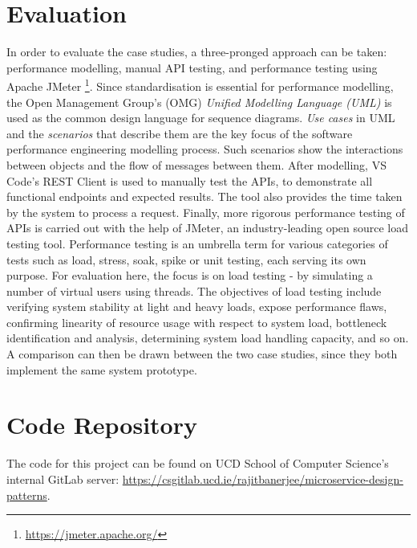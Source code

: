 \section{Evaluation}

In order to evaluate the case studies, a three-pronged approach can be taken: performance modelling, manual API testing, and performance testing using Apache JMeter \footnote{\url{https://jmeter.apache.org/}}. Since standardisation is essential for performance modelling, the Open Management Group's (OMG) \textit{Unified Modelling Language (UML)} is used as the common design language for sequence diagrams. \textit{Use cases} in UML and the \textit{scenarios} that describe them are the key focus of the software performance engineering modelling process. Such scenarios show the interactions between objects and the flow of messages between them. After modelling, VS Code's REST Client is used to manually test the APIs, to demonstrate all functional endpoints and expected results. The tool also provides the time taken by the system to process a request. Finally, more rigorous performance testing of APIs is carried out with the help of JMeter, an industry-leading open source load testing tool. Performance testing is an umbrella term for various categories of tests such as load, stress, soak, spike or unit testing, each serving its own purpose. For evaluation here, the focus is on load testing - by simulating a number of virtual users using threads. The objectives of load testing include verifying system stability at light and heavy loads, expose performance flaws, confirming linearity of resource usage with respect to system load, bottleneck identification and analysis, determining system load handling capacity, and so on. A comparison can then be drawn between the two case studies, since they both implement the same system prototype. 

\section{Code Repository}

The code for this project can be found on UCD School of Computer Science's internal GitLab server: \url{https://csgitlab.ucd.ie/rajitbanerjee/microservice-design-patterns}.
